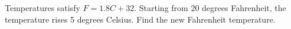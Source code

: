 Temperatures satisfy $F=1.8C+32$. Starting from 20 degrees Fahrenheit, the temperature rises 5 degrees Celsius. Find the new Fahrenheit temperature.
